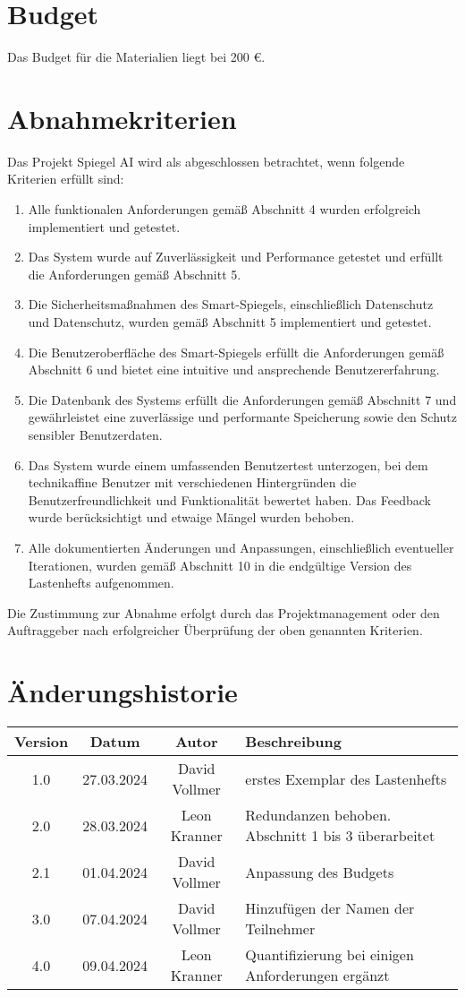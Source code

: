 \documentclass{article}
\begin{document}
\section{Budget}
Das Budget für die Materialien liegt bei 200 €.

\section{Abnahmekriterien}
Das Projekt Spiegel AI wird als abgeschlossen betrachtet, wenn folgende Kriterien erfüllt sind:

\begin{enumerate}
    \item Alle funktionalen Anforderungen gemäß Abschnitt 4 wurden erfolgreich implementiert und getestet.
    \item Das System wurde auf Zuverlässigkeit und Performance getestet und erfüllt die Anforderungen gemäß Abschnitt 5.
    \item Die Sicherheitsmaßnahmen des Smart-Spiegels, einschließlich Datenschutz und Datenschutz, wurden gemäß Abschnitt 5 implementiert und getestet.
    \item Die Benutzeroberfläche des Smart-Spiegels erfüllt die Anforderungen gemäß Abschnitt 6 und bietet eine intuitive und ansprechende Benutzererfahrung.
    \item Die Datenbank des Systems erfüllt die Anforderungen gemäß Abschnitt 7 und gewährleistet eine zuverlässige und performante Speicherung sowie den Schutz sensibler Benutzerdaten.
    \item Das System wurde einem umfassenden Benutzertest unterzogen, bei dem technikaffine Benutzer mit verschiedenen Hintergründen die Benutzerfreundlichkeit und Funktionalität bewertet haben. Das Feedback wurde berücksichtigt und etwaige Mängel wurden behoben.
    \item Alle dokumentierten Änderungen und Anpassungen, einschließlich eventueller Iterationen, wurden gemäß Abschnitt 10 in die endgültige Version des Lastenhefts aufgenommen.
\end{enumerate}

Die Zustimmung zur Abnahme erfolgt durch das Projektmanagement oder den Auftraggeber nach erfolgreicher Überprüfung der oben genannten Kriterien.


\section{Änderungshistorie}
\begin{tabular}{|c|c|c|l|}
    \hline
    Version & Datum & Autor & Beschreibung \\
    \hline
    1.0 & 27.03.2024 & David Vollmer & erstes Exemplar des Lastenhefts \\
    \hline
    2.0 & 28.03.2024 & Leon Kranner & Redundanzen behoben. Abschnitt 1 bis 3 überarbeitet \\
    \hline
    2.1 & 01.04.2024 & David Vollmer & Anpassung des Budgets \\
    \hline
    3.0 & 07.04.2024 & David Vollmer & Hinzufügen der Namen der Teilnehmer \\
    \hline
    4.0 & 09.04.2024 & Leon Kranner & Quantifizierung bei einigen Anforderungen ergänzt
\end{tabular}
\end{document}

